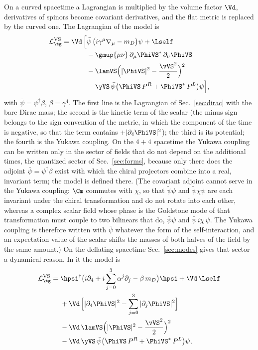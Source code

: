 On a curved spacetime a Lagrangian is multiplied by the volume factor $\Vd$, derivatives of spinors
become covariant derivatives, and the flat metric is replaced by the curved one.
The Lagrangian of the model is
\begin{align}
\mathcal L_{\tg}^{\mathrm{VS}}=\Vd\,\Big[&\bar\psi\,\big(i\gamma^{\mu}\nabla_\mu-m_D\big)\psi+\Lself\nonumber\\
&-\gmup{\mu\nu}\,\partial_\mu\PhiVS^{*}\,\partial_\nu\PhiVS\nonumber\\
&-\lamVS\Big(|\PhiVS|^{2}-\frac{\vVS^{2}}{2}\Big)^{2}\nonumber\\
&-\yVS\,\bar\psi\big(\PhiVS\,P^{R}+\PhiVS^{*}\,P^{L}\big)\psi\Big],
\label{eq:LVS}
\end{align}
with $\bar\psi=\psi^\dagger\beta$, $\beta=\gamma^{4}$. The first line is the Lagrangian of
Sec.~\ref{sec:dirac} with the bare Dirac mass; the second is the kinetic term of the scalar (the minus
sign belongs to the sign convention of the metric, in which the component of the time is negative,
so that the term contains $+|\partial_4\PhiVS|^{2}$); the third is its potential; the fourth is the
Yukawa coupling.
On the $4+4$ spacetime the Yukawa coupling can be written only in the sector of fields that do not
depend on the additional times, the quantized sector of Sec.~\ref{sec:forms}, because only there
does the adjoint $\bar\psi=\psi^\dagger\beta$ exist with which the chiral projectors combine into
a real, invariant term; the model is defined there. (The covariant adjoint cannot serve in the Yukawa
coupling: $\Cm$ commutes with $\chi$, so that $\tilde\psi\psi$ and $\tilde\psi\chi\psi$ are each
invariant under the chiral transformation and do not rotate into each other, whereas a complex
scalar field whose phase is the Goldstone mode of that transformation must couple to two bilinears
that do, $\bar\psi\psi$ and $\bar\psi\,i\chi\,\psi$. The Yukawa coupling is therefore written with
$\bar\psi$ whatever the form of the self-interaction, and an expectation value of the scalar shifts
the masses of both halves of the field by the same amount.) On the deflating spacetime Sec.~\ref{sec:modes}
gives that sector a dynamical reason. In it the model is
\begin{align}
\mathcal L_{\tg}^{\mathrm{VS}}={}&\hpsi^\dagger\big(i\partial_4+i\sum_{j=0}^{3}\alpha^{j}\partial_j-\beta\,m_D\big)\hpsi+\Vd\,\Lself\nonumber\\
&+\Vd\,\Big[|\partial_4\PhiVS|^{2}-\sum_{j=0}^{3}|\partial_j\PhiVS|^{2}\Big]\nonumber\\
&-\Vd\,\lamVS\Big(|\PhiVS|^{2}-\frac{\vVS^{2}}{2}\Big)^{2}\nonumber\\
&-\Vd\,\yVS\,\bar\psi\big(\PhiVS\,P^{R}+\PhiVS^{*}\,P^{L}\big)\psi ,
\label{eq:LVS}
\end{align}
